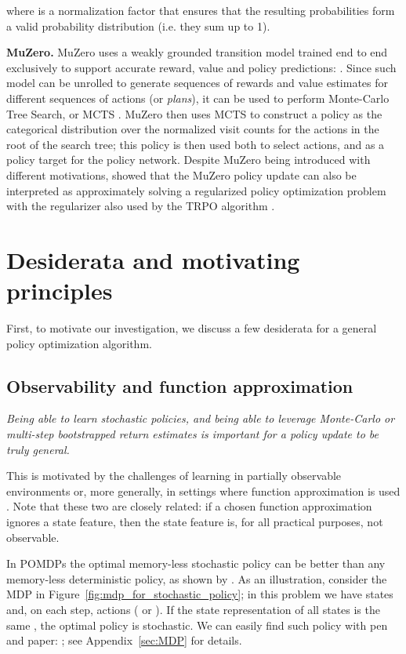 \documentclass{article}
\begin{document}
where  is a normalization factor that ensures that the resulting probabilities form a valid probability distribution (i.e. they sum up to 1).

\textbf{MuZero.}
MuZero \citep{schrittwieser2019} uses a weakly grounded \citep{grimm2020value} transition model  trained end to end exclusively to support accurate reward, value and policy predictions: . Since such model can be unrolled to generate sequences of rewards and value estimates for different sequences of actions (or \textit{plans}), it can be used to perform Monte-Carlo Tree Search, or MCTS \cite{Coulom2006}. MuZero then uses MCTS to construct a policy as the categorical distribution over the normalized visit counts for the actions in the root of the search tree; this policy is then used  both to select actions, and as a policy target for the policy network. Despite MuZero being introduced with different motivations, \citet{jbgrill2020} showed that the MuZero policy update can also be interpreted as approximately solving a regularized policy optimization problem with the regularizer  also used by the TRPO algorithm \citep{schulman2015trust}.

\section{Desiderata and motivating principles} \label{desiderata}

First, to motivate our investigation, we discuss a few desiderata for a general policy optimization algorithm.

\vspace{-1pt}

\subsection{Observability and function approximation}\label{POFA} \textit{Being able to learn stochastic policies, and being able to leverage Monte-Carlo or multi-step bootstrapped return estimates is important for a policy update to be truly general. }

This is motivated by the challenges of learning in partially observable environments \citep{astrom1965} or, more generally, in settings where function approximation is used \cite{sutton2018reinforcement}. Note that these two are closely related: if a chosen function approximation ignores a state feature, then the state feature is, for all practical purposes, not observable. 

In POMDPs the optimal memory-less stochastic policy can be better than any memory-less deterministic policy, as shown by \citet{singh1994learning}. As an illustration, consider the MDP in Figure~\ref{fig:mdp_for_stochastic_policy}; in this problem we have  states and, on each step,  actions ( or ). If the state representation of all states is the same , the optimal policy is stochastic. We can easily find such policy with pen and paper: ; see Appendix~\ref{sec:MDP} for details.
\end{document}
